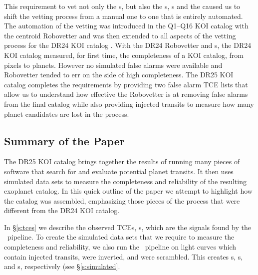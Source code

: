 This requirement to vet not only the \opstce s, but also the \injtce s, \scrtce s and the  caused us to shift the vetting process from a manual one to one that is entirely automated.  The automation of the vetting was introduced in the Q1--Q16 KOI catalog \citet{Mullally2015cat} with the centroid Robovetter and was then extended to all aspects of the vetting process for the DR24 KOI catalog \citep{Coughlin2016}. With the DR24 Robovetter and \injtce s, the DR24 KOI catalog measured, for first time, the completeness of a KOI catalog, from pixels to planets.  However no simulated false alarms were available and Robovetter tended to err on the side of high completeness.  The DR25 KOI catalog completes the requirements by providing two false alarm TCE lists that allow us to understand how effective the Robovetter is at removing false alarms from the final catalog while also providing injected transits to measure how many planet candidates are lost in the process.  

\subsection{Summary of the Paper}

The DR25 KOI catalog brings together the results of running many pieces of software that search for and evaluate potential planet transits. It then uses simulated data sets to measure the completeness and reliability of the resulting exoplanet catalog.  In this quick outline of the paper we attempt to highlight how the catalog was assembled, emphasizing those pieces of the process that were different from the DR24 KOI catalog.

In \S\ref{s:tces} we describe the observed TCEs, \opstce s, which are the signals found by the \Kepler\ pipeline. To create the simulated data sets that we require to measure the completeness and reliability, we also run the \Kepler\ pipeline on light curves which contain injected transits, were inverted, and were scrambled. This creates \injtce s, \invtce s, and \scrtce s, respectively (see \S\ref{s:simulated}.  

